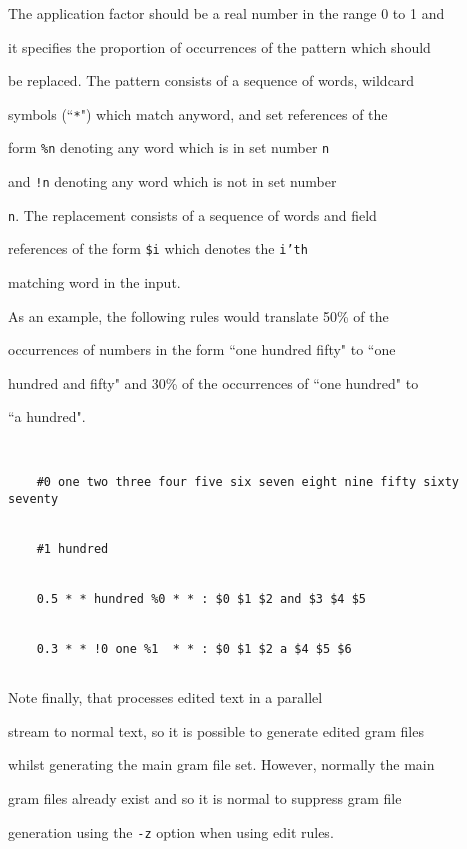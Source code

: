 The application factor should be a real number in the range 0 to 1 and


it specifies the proportion of occurrences of the pattern which should


be replaced.  The pattern consists of a sequence of words, wildcard


symbols (``\texttt{*}") which match anyword, and set references of the


form \texttt{\%n} denoting any word which is in set number \texttt{n}


and \texttt{!n} denoting any word which is not in set number


\texttt{n}.  The replacement consists of a sequence of words and field


references of the form \texttt{\$i} which denotes the \texttt{i'th}


matching word in the input.





As an example, the following rules would translate 50\% of the


occurrences of numbers in the form ``one hundred fifty" to ``one


hundred and fifty" and 30\% of the occurrences of ``one hundred" to


``a hundred".


\begin{verbatim}


    #0 one two three four five six seven eight nine fifty sixty seventy


    #1 hundred


    0.5 * * hundred %0 * * : $0 $1 $2 and $3 $4 $5


    0.3 * * !0 one %1  * * : $0 $1 $2 a $4 $5 $6


\end{verbatim}


Note finally, that  processes edited text in a parallel


stream to normal text, so it is possible to generate edited gram files


whilst generating the main gram file set.  However, normally the main


gram files already exist and so it is normal to suppress gram file


generation using the \texttt{-z} option when using edit rules.





